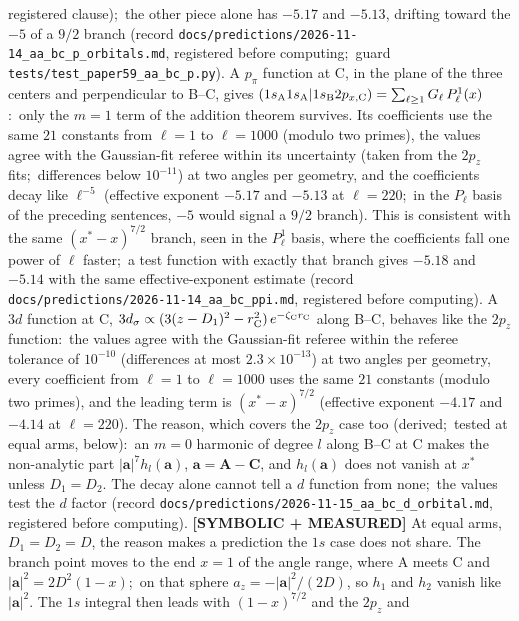 \documentclass[aps,pra,twocolumn,superscriptaddress,longbibliography]{revtex4-2}
\begin{document}
registered clause);\ the other piece
alone has $-5.17$ and $-5.13$, drifting toward the $-5$ of a $9/2$ branch
(record \texttt{docs/predictions/2026-11-14\_aa\_bc\_p\_orbitals.md}, registered before
computing;\ guard \texttt{tests/test\_paper59\_aa\_bc\_p.py}).  A $p_\pi$ function at C, in the
plane of the three centers and perpendicular to B--C, gives
$(1s_{\rm A}1s_{\rm A}|1s_{\rm B}2p_{x,{\rm C}})=\sum_{\ell\ge1}G_\ell\,P_\ell^{1}(x)$:\ only the
$m=1$ term of the addition theorem survives.  Its coefficients use the same $21$ constants from
$\ell=1$ to $\ell=1000$ (modulo two primes), the values agree with the Gaussian-fit referee within its
uncertainty (taken from the $2p_z$ fits;\ differences below $10^{-11}$) at two angles per geometry, and the coefficients decay like $\ell^{-5}$ (effective
exponent $-5.17$ and $-5.13$ at $\ell=220$;\ in the $P_\ell$ basis of the preceding sentences, $-5$
would signal a $9/2$ branch).  This is consistent with the same $(x^{*}-x)^{7/2}$ branch, seen in
the $P_\ell^{1}$ basis, where the coefficients fall one power of $\ell$ faster;\ a test function with
exactly that branch gives $-5.18$ and $-5.14$ with the same effective-exponent estimate (record
\texttt{docs/predictions/2026-11-14\_aa\_bc\_ppi.md}, registered before computing).  A $3d$
function at C, $3d_{\sigma}\propto(3(z-D_1)^2-r_{\rm C}^2)\,e^{-\zeta_{\rm C}r_{\rm C}}$ along B--C,
behaves like the $2p_z$ function:\ the values agree with the Gaussian-fit referee within the
referee tolerance of $10^{-10}$ (differences at most $2.3\times10^{-13}$) at two angles per
geometry, every coefficient from $\ell=1$ to $\ell=1000$ uses the same $21$ constants (modulo two
primes), and the leading term is $(x^{*}-x)^{7/2}$ (effective exponent $-4.17$ and $-4.14$ at
$\ell=220$).  The reason, which covers the $2p_z$ case too (derived;\ tested at equal arms, below):\ an $m=0$ harmonic of degree $l$ along B--C at C makes the non-analytic part $|\mathbf{a}|^{7}h_l(\mathbf{a})$, $\mathbf{a}=\mathbf{A}-\mathbf{C}$,
and $h_l(\mathbf{a})$ does not vanish at $x^{*}$ unless $D_1=D_2$.  The decay alone cannot tell a
$d$ function from none;\ the values test the $d$ factor (record
\texttt{docs/predictions/2026-11-15\_aa\_bc\_d\_orbital.md}, registered before computing).
\textbf{[SYMBOLIC + MEASURED]} At equal arms, $D_1=D_2=D$, the reason makes a prediction the $1s$
case does not share.  The branch point moves to the end $x=1$ of the angle range, where A meets
C and $|\mathbf{a}|^2=2D^2(1-x)$;\ on that sphere $a_z=-|\mathbf{a}|^2/(2D)$, so $h_1$ and $h_2$
vanish like $|\mathbf{a}|^2$.  The $1s$ integral then leads with $(1-x)^{7/2}$ and the $2p_z$ and
\end{document}

